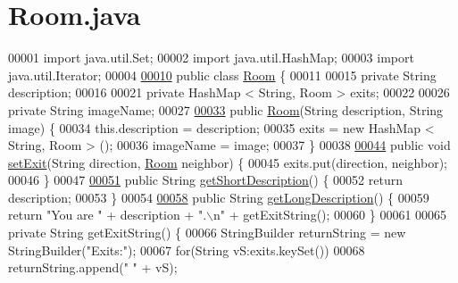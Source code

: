 \hypertarget{Room_8java_source}{\section{Room.\-java}
}

\begin{DoxyCode}
00001 \textcolor{keyword}{import} java.util.Set;
00002 \textcolor{keyword}{import} java.util.HashMap;
00003 \textcolor{keyword}{import} java.util.Iterator;
00004 
\hypertarget{Room_8java_source_l00010}{}\hyperlink{classRoom}{00010} \textcolor{keyword}{public} \textcolor{keyword}{class }\hyperlink{classRoom}{Room} \{
00011 
00015     \textcolor{keyword}{private} String description;
00016 
00021     \textcolor{keyword}{private} HashMap < String, Room > exits;
00022 
00026     \textcolor{keyword}{private} String imageName;
00027 
\hypertarget{Room_8java_source_l00033}{}\hyperlink{classRoom_a2cdcbb3d86746330a5a01c7fae4de02c}{00033}     \textcolor{keyword}{public} \hyperlink{classRoom_a2cdcbb3d86746330a5a01c7fae4de02c}{Room}(String description, String image) \{
00034         this.description = description;
00035         exits = \textcolor{keyword}{new} HashMap < String, Room > ();
00036         imageName = image;
00037     \}
00038 
\hypertarget{Room_8java_source_l00044}{}\hyperlink{classRoom_ae4bc6837f331b5249beb0651fc277018}{00044}     \textcolor{keyword}{public} \textcolor{keywordtype}{void} \hyperlink{classRoom_ae4bc6837f331b5249beb0651fc277018}{setExit}(String direction, \hyperlink{classRoom}{Room} neighbor) \{
00045         exits.put(direction, neighbor);
00046     \}
00047 
\hypertarget{Room_8java_source_l00051}{}\hyperlink{classRoom_a85e561bc5fa9d9c965300e9ad264b02a}{00051}     \textcolor{keyword}{public} String \hyperlink{classRoom_a85e561bc5fa9d9c965300e9ad264b02a}{getShortDescription}() \{
00052         \textcolor{keywordflow}{return} description;
00053     \}
00054 
\hypertarget{Room_8java_source_l00058}{}\hyperlink{classRoom_a23a25854d7544fb0b41190a4d6bd1322}{00058}     \textcolor{keyword}{public} String \hyperlink{classRoom_a23a25854d7544fb0b41190a4d6bd1322}{getLongDescription}() \{
00059         \textcolor{keywordflow}{return} \textcolor{stringliteral}{"You are "} + description + \textcolor{stringliteral}{".\(\backslash\)n"} + getExitString();
00060     \}
00061 
00065     \textcolor{keyword}{private} String getExitString() \{
00066         StringBuilder returnString = \textcolor{keyword}{new} StringBuilder(\textcolor{stringliteral}{"Exits:"});
00067         \textcolor{keywordflow}{for}(String vS:exits.keySet())
00068             returnString.append(\textcolor{stringliteral}{" "} + vS);

\end{DoxyCode}
